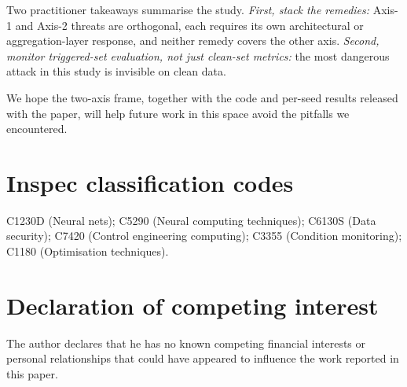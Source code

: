 \documentclass[a4paper,fleqn,doubleblind]{cas-sc}
\begin{document}
\noindent
Two practitioner takeaways summarise the study. \emph{First, stack
the remedies:} Axis-1 and Axis-2 threats are orthogonal, each
requires its own architectural or aggregation-layer response, and
neither remedy covers the other axis. \emph{Second, monitor
triggered-set evaluation, not just clean-set metrics:} the most
dangerous attack in this study is invisible on clean data.

\noindent
We hope the two-axis frame, together with the code and per-seed
results released with the paper, will help future work in this
space avoid the pitfalls we encountered.




\section*{Inspec classification codes}
C1230D (Neural nets); C5290 (Neural computing techniques);
C6130S (Data security); C7420 (Control engineering computing);
C3355 (Condition monitoring); C1180 (Optimisation techniques).

\section*{Declaration of competing interest}
The author declares that he has no known competing financial
interests or personal relationships that could have appeared to
influence the work reported in this paper.
\end{document}
